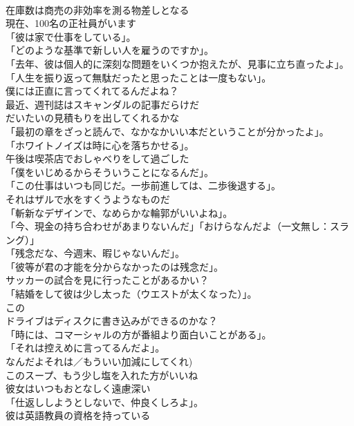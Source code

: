 \documentclass[8pt]{extreport}
\begin{document}
\begin{CJK}{UTF8}{min}
\\	在庫数は商売の非効率を測る物差しとなる	
\\	現在、100名の正社員がいます	
\\	「彼は家で仕事をしている」。	
\\	「どのような基準で新しい人を雇うのですか」。	
\\	「去年、彼は個人的に深刻な問題をいくつか抱えたが、見事に立ち直ったよ」。	
\\	「人生を振り返って無駄だったと思ったことは一度もない」。	
\\	僕には正直に言ってくれてるんだよね？	
\\	最近、週刊誌はスキャンダルの記事だらけだ	
\\	だいたいの見積もりを出してくれるかな	
\\	「最初の章をざっと読んで、なかなかいい本だということが分かったよ」。	
\\	「ホワイトノイズは時に心を落ちかせる」。	
\\	午後は喫茶店でおしゃべりをして過ごした	
\\	「僕をいじめるからそういうことになるんだ」。	
\\	「この仕事はいつも同じだ。一歩前進しては、二歩後退する」。	
\\	それはザルで水をすくうようなものだ	
\\	「斬新なデザインで、なめらかな輪郭がいいよね」。	
\\	「今、現金の持ち合わせがあまりないんだ」「おけらなんだよ（一文無し：スラング）」	
\\	「残念だな、今週末、暇じゃないんだ」。	
\\	「彼等が君の才能を分からなかったのは残念だ」。	
\\	サッカーの試合を見に行ったことがあるかい？	
\\	「結婚をして彼は少し太った（ウエストが太くなった）」。	
\\	この
\\	ドライブはディスクに書き込みができるのかな？	
\\	「時には、コマーシャルの方が番組より面白いことがある」。	
\\	「それは控えめに言ってるんだよ」。	
\\	なんだよそれは／もういい加減にしてくれ)	
\\	このスープ、もう少し塩を入れた方がいいね	
\\	彼女はいつもおとなしく遠慮深い	
\\	「仕返ししようとしないで、仲良くしろよ」。	
\\	彼は英語教員の資格を持っている	

\end{CJK}
\end{document}

